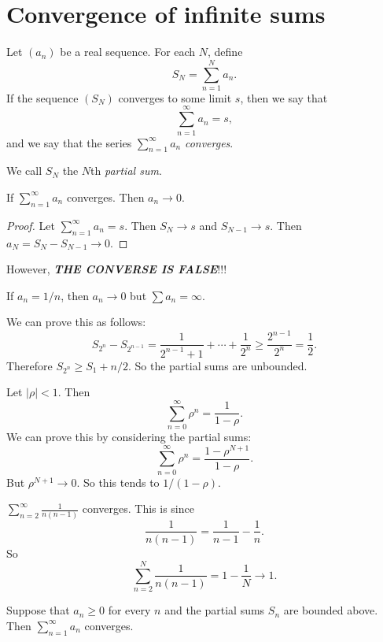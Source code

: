 \documentclass[a4paper]{article}
\begin{document}
\section{Convergence of infinite sums}
\begin{defi}
  Let $(a_n)$ be a real sequence. For each $N$, define
  \[
    S_N = \sum_{n = 1}^N a_n.
  \]
  If the sequence $(S_N)$ converges to some limit $s$, then we say that
  \[
    \sum_{n = 1}^\infty a_n = s,
  \]
  and we say that the series $\displaystyle\sum_{n = 1}^\infty a_n$ \emph{converges}.

  We call $S_N$ the $N$th \emph{partial sum}.
\end{defi}

\begin{lemma}
  If $\displaystyle\sum_{n = 1}^\infty a_n$ converges. Then $a_n \to 0$.
\end{lemma}

\begin{proof}
  Let $\displaystyle\sum_{n = 1}^{\infty} a_n = s$. Then $S_N \to s$ and $S_{N - 1} \to s$. Then $a_N = S_N - S_{N - 1} \to 0$.
\end{proof}

However, \textbf{\textit{THE CONVERSE IS FALSE}}!!!
\begin{eg}
  If $a_n = 1/n$, then $a_n \to 0$ but $\sum a_n = \infty$.

  We can prove this as follows:
  \[
    S_{2^n} - S_{2^{n -1 }} = \frac{1}{2^{n - 1} + 1} + \cdots + \frac{1}{2^n} \geq \frac{2^{n - 1}}{2^n} = \frac{1}{2}.
  \]
  Therefore $S_{2^n} \geq S_1 + n/2$. So the partial sums are unbounded.
\end{eg}

\begin{eg}
  Let $|\rho| < 1$. Then
  \[
    \sum_{n = 0}^\infty \rho^n = \frac{1}{1 - \rho}.
  \]
  We can prove this by considering the partial sums:
  \[
    \sum_{n = 0}^\infty \rho^n = \frac{1 - \rho^{N + 1}}{1 - \rho}.
  \]
  But $\rho^{N + 1} \to 0$. So this tends to $1/(1 - \rho)$.
\end{eg}

\begin{eg}
  $\displaystyle \sum_{n = 2}^\infty \frac{1}{n(n - 1)}$ converges. This is since
  \[
    \frac{1}{n(n -1 )} = \frac{1}{n - 1} - \frac{1}{n}.
  \]
  So
  \[
    \sum_{n = 2}^{N}\frac{1}{n(n - 1)} = 1 - \frac{1}{N} \to 1.
  \]
\end{eg}
\begin{lemma}
  Suppose that $a_n \geq 0$ for every $n$ and the partial sums $S_n$ are bounded above. Then $\sum_{n=1}^\infty a_n$ converges.
\end{lemma}
\end{document}
